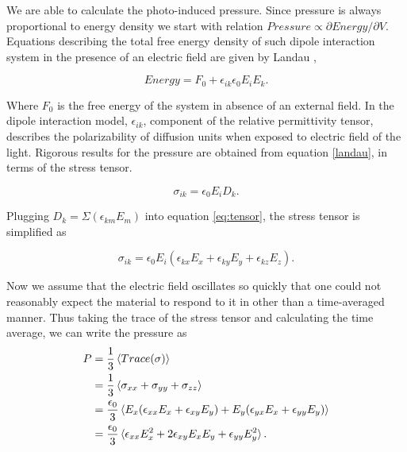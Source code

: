 \documentclass[aps, prl, twocolumn, groupedaddress]{revtex4-1}
\begin{document}
We are able to calculate the photo-induced pressure. Since
pressure is always proportional to energy density we start with
relation $Pressure \propto \partial Energy / \partial V$. Equations
describing the total free energy density of such dipole interaction
system in the presence of an electric field are given by Landau
\cite{Landau},

\begin{equation}
  Energy = F_0 + \epsilon_{ik}\epsilon_0E_iE_k \mathrm{.}
  \label{landau}
\end{equation}

Where $F_0$ is the free energy of the system in absence of an external
field. In the dipole interaction model, $\epsilon_{ik}$, component of
the relative permittivity tensor, describes the polarizability of
diffusion units when exposed to electric field of the light. Rigorous
results for the pressure are obtained from equation \ref{landau}, in
terms of the stress tensor.

\begin{equation}
  \label{eq:tensor}
  \sigma_{ik} = \epsilon_0 E_i D_k \mathrm{.}
\end{equation}

Plugging $D_k = \Sigma (\epsilon_{km} E_m)$ into equation \ref{eq:tensor},
the stress tensor is simplified as

\begin{equation}
  \sigma_{ik} = \epsilon_0 E_i (\epsilon_{kx}E_x + \epsilon_{ky}E_y +
  \epsilon_{kz}E_z) \mathrm{.}
\end{equation}

Now we assume that the electric field oscillates so quickly that one could not
reasonably expect the material to respond to it in other than a
time-averaged manner. Thus taking the trace of the stress tensor and calculating
the time average, we can write the pressure as
\begin{equation}
  \label{eq:pressure1}
  \begin{split}
    P &= \frac{1}{3}\braket{Trace(\sigma)} \\
    &= \frac{1}{3}\braket{\sigma_{xx} + \sigma_{yy} + \sigma_{zz}} \\
    &= \frac{\epsilon_0}{3}\braket{E_x(\epsilon_{xx}E_x + \epsilon_{xy}E_y) + E_y(\epsilon_{yx}E_x
      + \epsilon_{yy}E_y)}\\
    &= \frac{\epsilon_0}{3}\braket{\epsilon_{xx}E_x^2 + 2
      \epsilon_{xy}E_xE_y + \epsilon_{yy}E_y^2} \mathrm{.}\\
  \end{split}
\end{equation}
\end{document}
